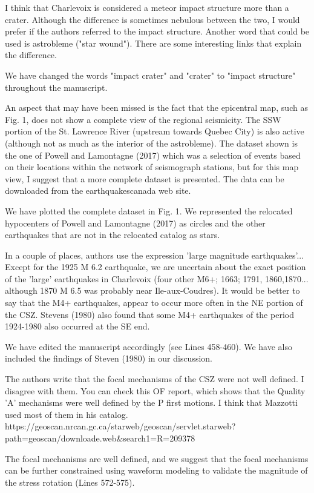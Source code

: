 \documentclass[12pt]{article}
\begin{document}
\begin{response}{I think that Charlevoix is considered a meteor impact structure more than a crater. Although the difference is sometimes nebulous between the two, I would prefer if the authors referred to the impact structure. Another word that could be used is astrobleme ("star wound"). There are some interesting links that explain the difference.}

  We have changed the words "impact crater" and "crater" to "impact structure" throughout the manuscript.
\end{response}

\begin{response}{An aspect that may have been missed is the fact that the epicentral map, such as Fig. 1, does not show a complete view of the regional seismicity. The SSW portion of the St. Lawrence River (upstream towards Quebec City) is also active (although not as much as the interior of the astrobleme). The dataset shown is the one of Powell and Lamontagne (2017) which was a selection of events based on their locations within the network of seismograph stations, but for this map view, I suggest that a more complete dataset is presented. The data can be downloaded from the earthquakescanada web site.}

  We have plotted the complete dataset in Fig. 1. We represented the relocated hypocenters of Powell and Lamontagne (2017) as circles and the other earthquakes that are not in the relocated catalog as stars.
\end{response}

\begin{response}{In a couple of places, authors use the expression 'large magnitude earthquakes'... Except for the 1925 M 6.2 earthquake, we are uncertain about the exact position of the 'large' earthquakes in Charlevoix (four other M6+; 1663; 1791, 1860,1870... although 1870 M 6.5 was probably near Ile-aux-Coudres). It would be better to say that the M4+ earthquakes, appear to occur more often in the NE portion of the CSZ. Stevens (1980) also found that some M4+ earthquakes of the period 1924-1980 also occurred at the SE end.}

  We have edited the manuscript accordingly (see Lines 458-460). We have also included the findings of Steven (1980) in our discussion.
\end{response}

\begin{response}{The authors write that the focal mechanisms of the CSZ were not well defined. I disagree with them. You can check this OF report, which shows that the Quality 'A' mechanisms were well defined by the P first motions. I think that Mazzotti used most of them in his catalog.
https://geoscan.nrcan.gc.ca/starweb/geoscan/servlet.starweb?
path=geoscan/downloade.web\&search1=R=209378}

 The focal mechanisms are well defined, and we suggest that the focal mechanisms can be further constrained using waveform modeling to validate the magnitude of the stress rotation (Lines 572-575).
\end{response}
\end{document}
